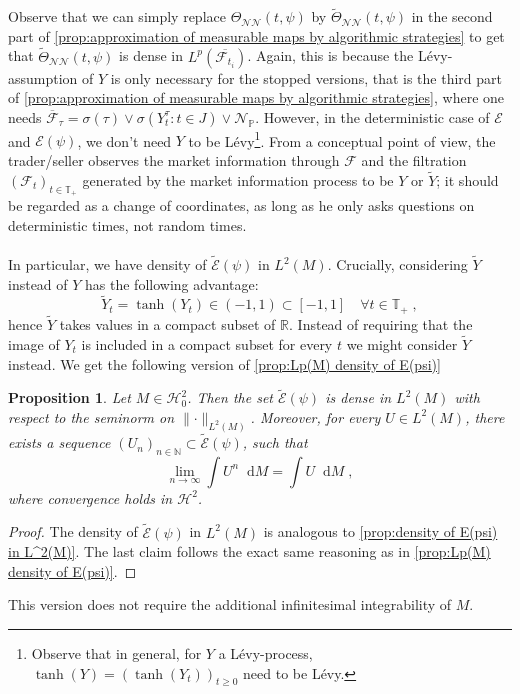 \documentclass[11pt]{report}
\newcommand{\diff}{\mathop{}\!\mathrm{d}}
\theoremstyle{plain} %
\newtheorem{proposition}[proposition]{Proposition}
\theoremstyle{definition} %
\theoremstyle{remark} %
\begin{document}
 Observe that we can simply replace \({\Theta}_{\mathcal{NN}}(t,\psi)\) by \(\widetilde{\Theta}_{\mathcal{NN}}(t,\psi)\) in the second part of  \cref{prop:approximation of measurable maps by algorithmic strategies} to get that \(\widetilde{\Theta}_{\mathcal{NN}}(t,\psi)\) is dense in \(L^p(\overline{{\mathcal{F}_{t_i}}})\). Again, this is because the Lévy-assumption of \(Y\) is only necessary for the stopped versions, that is the third part of \cref{prop:approximation of measurable maps by algorithmic strategies}, where one needs \(\overline{\mathcal{F}}_{\tau}=\sigma(\tau)\vee\sigma(Y_t^{\tau}:t\in J)\vee\mathcal{N}_{\mathbb{P}}\). However, in the deterministic case of \(\mathcal{E}\) and \(\mathcal{E}(\psi)\), we don't need \(Y\) to be Lévy\footnote{Observe that in general, for \(Y\) a Lévy-process, \(\tanh(Y)=(\tanh(Y_t))_{t\geq 0}\) need to be Lévy.}. From a conceptual point of view, the trader/seller observes the market information through \(\mathcal{F}\) and the filtration \((\mathcal{F}_t)_{t\in\mathbb{T}_+}\) generated by the market information process to be \(Y\) or \(\widetilde{Y}\); it should be regarded as a change of coordinates, as long as he only asks questions on deterministic times, not random times. 
 \\\\
 In particular, we have density of \(\widetilde{\mathcal{E}}(\psi)\) in \(L^2(M)\). Crucially, considering \(\widetilde{Y}\) instead of \(Y\) has the following advantage:
\begin{equation}
\widetilde{Y}_t=\tanh(Y_t)\in(-1,1)\subset[-1,1]\quad\forall t\in\mathbb{T}_+\;,
\end{equation}
hence \(\widetilde{Y}\) takes values in a compact subset of \(\mathbb{R}\). Instead of requiring that the image of \(Y_t\) is included in a compact subset for every \(t\) we might consider \(\widetilde{Y}\) instead. 
\bigbreak
We get the following version of \cref{prop:Lp(M) density of E(psi)}
\begin{proposition}\label{prop:Lp(M) density of E(psi) under compacteness}
    Let \(M\in\mathcal{H}_0^{2}\). Then the set \(\widetilde{\mathcal{E}}(\psi)\) is dense in \(L^2(M)\) with respect to the seminorm on \(\lVert\cdot\rVert_{L^2(M)}\). Moreover, for every \(U\in L^2(M)\), there exists a sequence \((U_n)_{n\in\mathbb{N}}\subset\widetilde{\mathcal{E}}(\psi)\), such that
    \begin{equation}
        \lim_{n\to\infty}\int U^n\diff M=\int U\diff M\;,
    \end{equation}
    where convergence holds in \(\mathcal{H}^2\). 
\end{proposition}
\begin{proof}
    The density of \(\widetilde{\mathcal{E}}(\psi)\) in \(L^2(M)\) is analogous to \cref{prop:density of E(psi) in L^2(M)}. The last claim follows the exact same reasoning as in \cref{prop:Lp(M) density of E(psi)}.
\end{proof}
This version does not require the additional infinitesimal integrability of \(M\).
\end{document}
